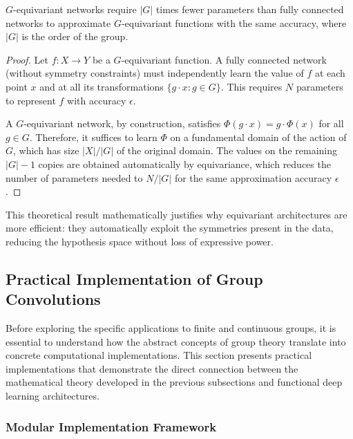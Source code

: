 \begin{corollary}\label{corollary:parametric_efficiency}
    $G$-equivariant networks require $|G|$ times fewer parameters than fully connected networks to approximate $G$-equivariant functions with the same accuracy, where $|G|$ is the order of the group.
\end{corollary}

\begin{proof}
Let $f: X \to Y$ be a $G$-equivariant function. A fully connected network (without symmetry constraints) must independently learn the value of $f$ at each point $x$ and at all its transformations $\{g \cdot x : g \in G\}$. This requires $N$ parameters to represent $f$ with accuracy $\epsilon$.

A $G$-equivariant network, by construction, satisfies $\Phi(g \cdot x) = g \cdot \Phi(x)$ for all $g \in G$. Therefore, it suffices to learn $\Phi$ on a fundamental domain of the action of $G$, which has size $|X|/|G|$ of the original domain. The values on the remaining $|G| - 1$ copies are obtained automatically by equivariance, which reduces the number of parameters needed to $N/|G|$ for the same approximation accuracy $\epsilon$.
\end{proof}

This theoretical result mathematically justifies why equivariant architectures are more efficient: they automatically exploit the symmetries present in the data, reducing the hypothesis space without loss of expressive power.

\subsection{Practical Implementation of Group Convolutions}\label{subsec:implementacion_practica_gcnn}

Before exploring the specific applications to finite and continuous groups, it is essential to understand how the abstract concepts of group theory translate into concrete computational implementations. This section presents practical implementations that demonstrate the direct connection between the mathematical theory developed in the previous subsections and functional deep learning architectures.

\subsubsection{Modular Implementation Framework}\label{subsubsec:marco_implementacion_modular}

